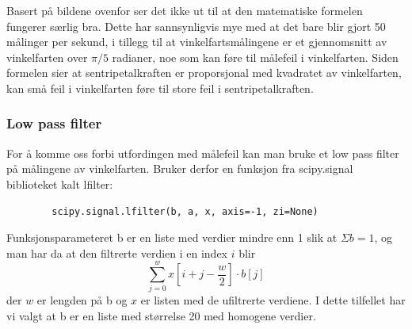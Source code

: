 \documentclass{article}
\begin{document}
Basert på bildene ovenfor ser det ikke ut til at den matematiske formelen fungerer særlig bra. 
Dette har sannsynligvis mye med at det bare blir gjort 50 målinger per sekund, i tillegg til at vinkelfartsmålingene 
er et gjennomsnitt av vinkelfarten over $\pi/5$ radianer, noe som kan føre til målefeil i vinkelfarten. Siden formelen 
sier at sentripetalkraften er proporsjonal med kvadratet av vinkelfarten, kan små feil i vinkelfarten føre til store feil i sentripetalkraften.

\subsubsection{Low pass filter}
For å komme oss forbi utfordingen med målefeil kan man bruke et low pass filter på målingene av vinkelfarten.
Bruker derfor en funksjon fra scipy.signal biblioteket kalt lfilter:

\begin{Codesnippet}
    \begin{verbatim}
        scipy.signal.lfilter(b, a, x, axis=-1, zi=None)
    \end{verbatim}
\end{Codesnippet}

Funksjonsparameteret b er en liste med verdier mindre enn 1 slik at $\Sigma{b} = 1$, og man har da at den filtrerte verdien i en index $i$ blir 
$$\sum_{j = 0}^{w}{x\left[i + j - \frac{w}{2}\right] \cdot b[j]}$$ 
der $w$ er lengden på b og $x$ er listen med de ufiltrerte verdiene. I dette tilfellet har vi valgt at b er en liste med størrelse 20 med homogene verdier.
\end{document}
